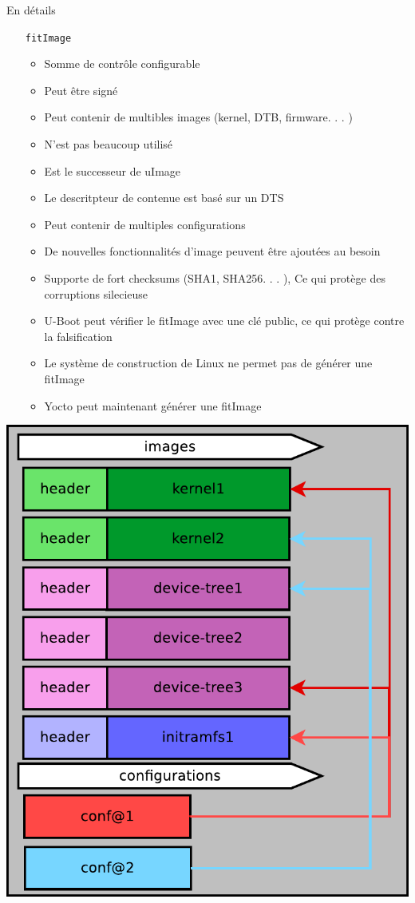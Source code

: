 \documentclass[aspectratio=169]{beamer}
\begin{document}
\begin{frame}{En détails}
\begin{itemize}
	\item[\texttt{fitImage}]
	\begin{itemize}
		\item Somme de contrôle configurable
		\item Peut être signé
		\item Peut contenir de multibles images (kernel, DTB, firmware. . . )
		\item N'est pas beaucoup utilisé
		\item Est le successeur de uImage
		\item Le descritpteur de contenue est basé sur un DTS
		\item Peut contenir de multiples configurations
		\item De nouvelles fonctionnalités d'image peuvent être ajoutées au besoin
		\item Supporte de fort checksums (SHA1, SHA256. . . ), Ce qui protège des corruptions silecieuse
		\item U-Boot peut vérifier le fitImage avec une clé public, ce qui protège contre la falsification
		\item Le système de construction de Linux ne permet pas de générer une fitImage
		\item Yocto peut maintenant générer une fitImage
	\end{itemize}
\end{itemize}
\end{frame}

\begin{frame}
\begin{center}
\includegraphics[height=0.9\textheight]{images/fitImage.png}
\end{center}
\end{frame}
\end{document}
